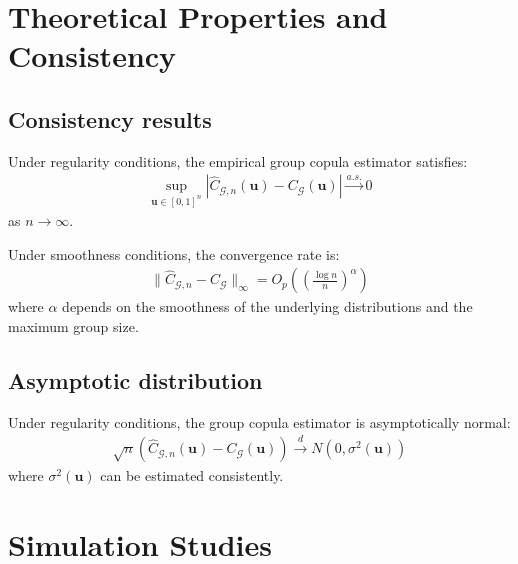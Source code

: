 \section{Theoretical Properties and Consistency}
\subsection{Consistency results}
\begin{theorem}
Under regularity conditions, the empirical group copula estimator satisfies:
\begin{align}
\sup_{\mathbf{u} \in [0,1]^{n}} |\hat{C}_{\mathcal{G},n}(\mathbf{u}) - C_{\mathcal{G}}(\mathbf{u})| \xrightarrow{a.s.} 0
\end{align}
as $n \to \infty$.
\end{theorem}

\begin{theorem}
Under smoothness conditions, the convergence rate is:
\begin{align}
\|\hat{C}_{\mathcal{G},n} - C_{\mathcal{G}}\|_\infty = O_p\left(\left(\frac{\log n}{n}\right)^{\alpha}\right)
\end{align}
where $\alpha$ depends on the smoothness of the underlying distributions and the maximum group size.
\end{theorem}

\subsection{Asymptotic distribution}
\begin{theorem}
Under regularity conditions, the group copula estimator is asymptotically normal:
\begin{align}
\sqrt{n}(\hat{C}_{\mathcal{G},n}(\mathbf{u}) - C_{\mathcal{G}}(\mathbf{u})) \xrightarrow{d} N(0, \sigma^2(\mathbf{u}))
\end{align}
where $\sigma^2(\mathbf{u})$ can be estimated consistently.
\end{theorem}

\section{Simulation Studies}
